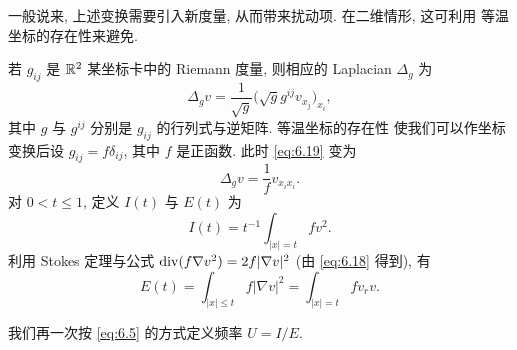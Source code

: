 一般说来, 上述变换需要引入新度量, 从而带来扰动项. 在二维情形, 这可利用
等温坐标的存在性来避免.

\begin{example}
\label{ex:6.8}
若 $g_{ij}$ 是 $\mathbb{R}^2$ 某坐标卡中的 Riemann 度量, 则相应的 Laplacian
$\Delta_g$ 为
\begin{equation}
\Delta_gv=\frac{1}{\sqrt{g}}\bigl(\sqrt{g}g^{ij}v_{x_j}\bigr)_{x_i},
\label{eq:6.19}
\end{equation}
其中 $g$ 与 $g^{ij}$ 分别是 $g_{ij}$ 的行列式与逆矩阵. 等温坐标的存在性
使我们可以作坐标变换后设 $g_{ij}=f\delta_{ij}$, 其中 $f$ 是正函数. 此时
\eqref{eq:6.19} 变为
\begin{equation}
\Delta_gv=\frac1f v_{x_ix_i}.
\label{eq:6.20}
\end{equation}
对 $0<t\leq1$, 定义 $I(t)$ 与 $E(t)$ 为
\begin{equation}
I(t)=t^{-1}\int_{|x|=t}fv^2.
\label{eq:6.21}
\end{equation}
利用 Stokes 定理与公式 $\operatorname{div}(f\nabla v^2)=2f|\nabla v|^2$ (由
\eqref{eq:6.18} 得到), 有
\begin{equation}
E(t)=\int_{|x|\leq t}f|\nabla v|^2=\int_{|x|=t}fv_rv.
\label{eq:6.22}
\end{equation}
\end{example}

我们再一次按 \eqref{eq:6.5} 的方式定义频率 $U=I/E$.

